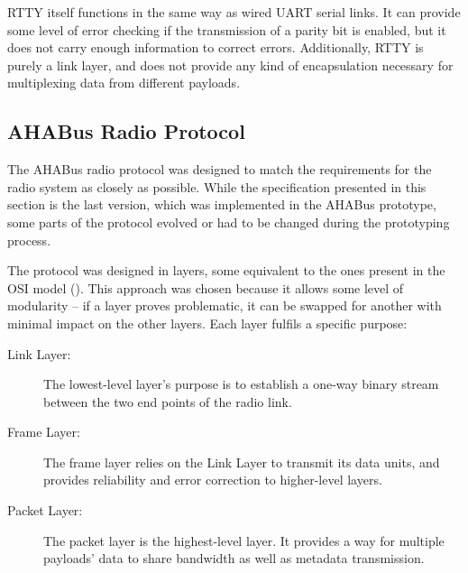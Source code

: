 RTTY itself functions in the same way as wired UART serial links. It can provide
some level of error checking if the transmission of a parity bit is enabled, but
it does not carry enough information to correct errors. Additionally, RTTY is
purely a link layer, and does not provide any kind of encapsulation necessary
for multiplexing data from different payloads.
%
%

\subsection{AHABus Radio Protocol}

The AHABus radio protocol was designed to match the requirements for the radio
system as closely as possible. While the specification presented in this section
is the last version, which was implemented in the AHABus prototype, some parts
of the protocol evolved or had to be changed during the prototyping process.

The protocol was designed in layers, some equivalent to the ones present in the
OSI model (\cite{Stallings1987}). This approach was chosen because it allows
some level of modularity – if a layer proves problematic, it can be swapped
for another with minimal impact on the other layers. Each layer fulfils a
specific purpose:


\begin{description}
\item[Link Layer:] The lowest-level layer's purpose is to establish a one-way
binary stream between the two end points of the radio link.

\item[Frame Layer:] The frame layer relies on the Link Layer to transmit its
data units, and provides reliability and error correction to higher-level 
layers.

\item[Packet Layer:] The packet layer is the highest-level layer. It provides
a way for multiple payloads' data to share bandwidth as well as metadata
transmission.
\end{description}

